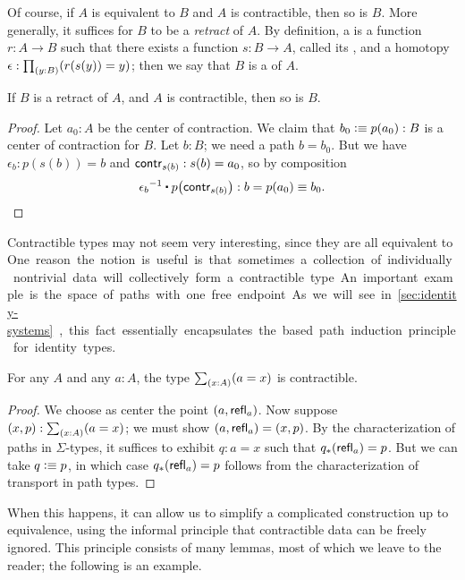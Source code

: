 Of course, if $A$ is equivalent to $B$ and $A$ is contractible, then so is $B$.
More generally, it suffices for $B$ to be a \emph{retract} of $A$.
By definition, a 
%
%
is a function $r : A \to B$ such that there exists a function $s : B \to A$, called its ,
%
%
and a homotopy $\epsilon:\prd{y:B} (r(s(y))=y)$; then we say that $B$ is a %
of $A$.

\begin{lem}\label{thm:retract-contr}
  If $B$ is a retract of $A$, and $A$ is contractible, then so is $B$.
\end{lem}
\begin{proof}
  Let $a_0 : A$ be the center of contraction.
  We claim that $b_0 \vcentcolon\equiv p(a_0) : B$ is a center of contraction for $B$.
  Let $b : B$; we need a path $b = b_0$.
  But we have $\epsilon_b : p(s(b)) = b$ and $\mathsf{contr}_{s(b)} : s(b) = a_0$, so by composition
  \[ \opp{\epsilon_b} \ct \ap{p}{\contr_{s(b)}} : b = p(a_0) \jdeq b_0 . \qedhere\]
\end{proof}

Contractible types may not seem very interesting, since they are all equivalent to \unit.
One reason the notion is useful is that sometimes a collection of individually nontrivial data will collectively form a contractible type.
An important example is the space of paths with one free endpoint.
As we will see in \autoref{sec:identity-systems}, this fact essentially
encapsulates the based path induction principle for identity types.

\begin{lem}\label{thm:contr-paths}
  For any $A$ and any $a:A$, the type $\sm{x:A} (a=x)$ is contractible.
\end{lem}
\begin{proof}
  We choose as center the point $(a,\mathsf{refl}_{a})$.
  Now suppose $(x,p):\sm{x:A}(a=x)$; we must show $(a,\mathsf{refl}_{a}) = (x,p)$.
  By the characterization of paths in $\Sigma$-types, it suffices to exhibit $q:a=x$ such that ${q}_{*}\mathopen{}\left({\mathsf{refl}_{a}}\right)\mathclose{} = p$.
  But we can take $q\vcentcolon\equiv p$, in which case ${q}_{*}\mathopen{}\left({\mathsf{refl}_{a}}\right)\mathclose{} = p$ follows from the characterization of transport in path types.
\end{proof}

When this happens, it can allow us to simplify a complicated construction up to equivalence, using the informal principle that contractible data can be freely ignored.
This principle consists of many lemmas, most of which we leave to the reader; the following is an example.

